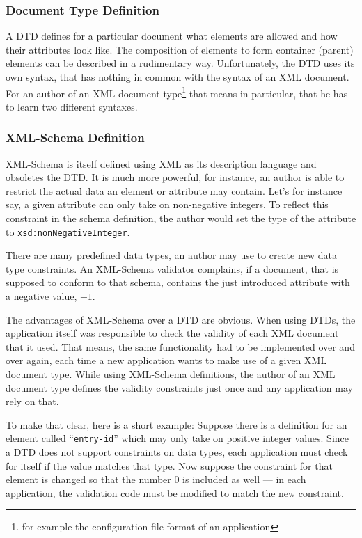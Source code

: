 \subsubsection{Document Type Definition}

A DTD defines for a particular  document what elements are allowed and how
their attributes look like. The  composition of elements to form container
(\ie parent)   elements  can   be   described  in   a  rudimentary   way.
Unfortunately, the  DTD uses  its own syntax,  that has nothing  in common
with  the syntax of  an XML  document. For  an author  of an  XML document
type\footnote{for example the configuration file format of an application}
that means in particular, that he has to learn two different syntaxes.

\subsubsection{XML-Schema Definition}

XML-Schema is  itself defined  using XML as  its description  language and
obsoletes the  DTD. It is much  more powerful, for instance,  an author is
able  to   restrict  the   actual  data  an   element  or   attribute  may
contain.  Let's for  instance  say, a  given  attribute can  only take  on
non-negative  integers.    To  reflect  this  constraint   in  the  schema
definition,  the   author  would  set   the  type  of  the   attribute  to
\texttt{xsd:nonNegativeInteger}.

There are many predefined data types, an author may use to create new data
type constraints.  An XML-Schema validator complains, if  a document, that
is  supposed to  conform  to  that schema,  contains  the just  introduced
attribute with a negative value, \eg $-1$.

The advantages of XML-Schema over a DTD are obvious.  When using DTDs, the
application  itself was  responsible to  check  the validity  of each  XML
document  that it  used.  That  means, the  same functionality  had  to be
implemented over and over again, \ie  each time a new application wants to
make use of a given XML document type. While using XML-Schema definitions,
the author of  an XML document type defines  the validity constraints just
once and any application  may rely on that.

To make that clear, here is a short example: Suppose there is a definition
for  an  element  called  ``\texttt{entry-id}''  which may  only  take  on
positive integer values.  Since a DTD does not support constraints on data
types, each  application must check for  itself if the  value matches that
type.  Now suppose the constraint for  that element is changed so that the
number $0$  is included  as well ---  in each application,  the validation
code must be modified to match the new constraint.

